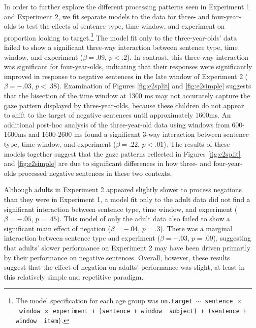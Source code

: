 \documentclass[man]{apa2}
\begin{document}
In order to further explore the different processing patterns seen in Experiment 1 and Experiment 2, we fit separate models to the data for three- and four-year-olds to test the effects of sentence type, time window, and experiment on proportion looking to target.\footnote{The model specification for each age group was \texttt{on.target $\sim$ sentence~$\times$~window~$\times$~experiment + (sentence + window~\textbar~subject) +  (sentence + window~\textbar~item)}.} The model fit only to the three-year-olds' data failed to show a significant three-way interaction between sentence type, time window, and experiment  ($\beta = .09$, $p < .2$).  In contrast, this three-way interaction was significant for four-year-olds, indicating that their responses were significantly improved in response to negative sentences in the late window of Experiment 2  ($\beta = -.03$, $p < .38$).  Examination of Figures \ref{fig:e2split} and \ref{fig:e2simple} suggests that the bisection of the time window at 1300 ms may not accurately capture the gaze pattern displayed by three-year-olds, because these children do not appear to shift to the target of negative sentences until approximately 1600ms.  An additional post-hoc analysis of the three-year-old data using windows from 600-1600ms and 1600-2600 ms found a significant 3-way interaction between sentence type, time window, and experiment ($\beta = .22$, $p < .01$).  The results of these models together suggest that the gaze patterns reflected in Figures \ref{fig:e2split} and \ref{fig:e2simple} are due to significant differences in how three- and four-year-olds processed negative sentences in these two contexts.  

Although adults in Experiment 2 appeared slightly slower to process negations than they were in Experiment 1, a model fit only to the adult data did not find a significant interaction between sentence type, time window, and experiment ($\beta = -.05$, $p = .45$).  This model of only the adult data also failed to show a significant main effect of negation ($\beta = -.04$, $p = .3$).  There was a marginal interaction between sentence type and experiment ($\beta = -.03$, $p = .09$), suggesting that adults' slower performance on Experiment 2 may have been driven primarily by their performance on negative sentences.  Overall, however, these results suggest that the effect of negation on adults' performance was slight, at least in this relatively simple and repetitive paradigm.  
\end{document}
